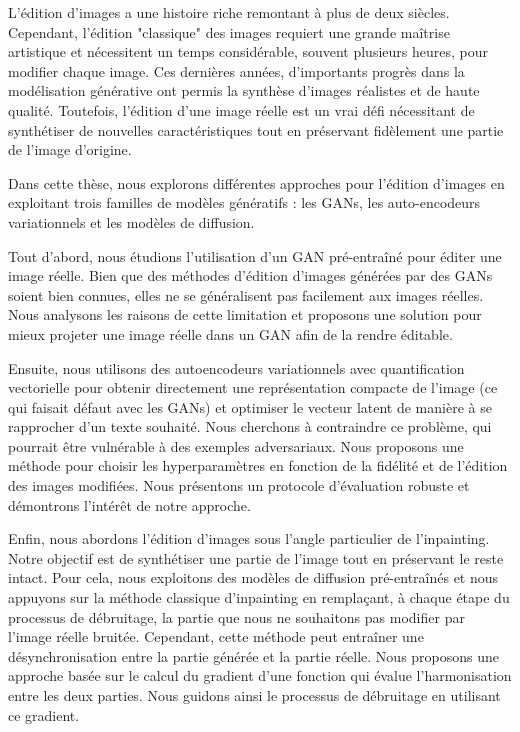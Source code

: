 \documentclass[
    a4paper,
    fontsize=12pt,
    footinclude=true,
    headinclude=true
	]{scrbook}
\begin{document}
L'édition d'images a une histoire riche remontant à plus de deux siècles. Cependant, l'édition "classique" des images requiert une grande maîtrise artistique et nécessitent un temps considérable, souvent plusieurs heures, pour modifier chaque image. Ces dernières années, d'importants progrès dans la modélisation générative ont permis la synthèse d'images réalistes et de haute qualité. Toutefois, l'édition d'une image réelle est un vrai défi nécessitant de synthétiser de nouvelles caractéristiques tout en préservant fidèlement une partie de l'image d'origine.

Dans cette thèse, nous explorons différentes approches pour l'édition d'images en exploitant trois familles de modèles génératifs : les GANs, les auto-encodeurs variationnels et les modèles de diffusion.

Tout d'abord, nous étudions l'utilisation d'un GAN pré-entraîné pour éditer une image réelle. Bien que des méthodes d'édition d'images générées par des GANs soient bien connues, elles ne se généralisent pas facilement aux images réelles. Nous analysons les raisons de cette limitation et proposons une solution pour mieux projeter une image réelle dans un GAN afin de la rendre éditable.

Ensuite, nous utilisons des autoencodeurs variationnels avec quantification vectorielle pour obtenir directement une représentation compacte de l'image (ce qui faisait défaut avec les GANs) et optimiser le vecteur latent de manière à se rapprocher d'un texte souhaité. Nous cherchons à contraindre ce problème, qui pourrait être vulnérable à des exemples adversariaux. Nous proposons une méthode pour choisir les hyperparamètres en fonction de la fidélité et de l'édition des images modifiées. Nous présentons un protocole d'évaluation robuste et démontrons l'intérêt de notre approche.

Enfin, nous abordons l'édition d'images sous l'angle particulier de l'inpainting. Notre objectif est de synthétiser une partie de l'image tout en préservant le reste intact. Pour cela, nous exploitons des modèles de diffusion pré-entraînés et nous appuyons sur la méthode classique d'inpainting en remplaçant, à chaque étape du processus de débruitage, la partie que nous ne souhaitons pas modifier par l'image réelle bruitée. Cependant, cette méthode peut entraîner une désynchronisation entre la partie générée et la partie réelle. Nous proposons une approche basée sur le calcul du gradient d'une fonction qui évalue l'harmonisation entre les deux parties. Nous guidons ainsi le processus de débruitage en utilisant ce gradient.
\end{document}
